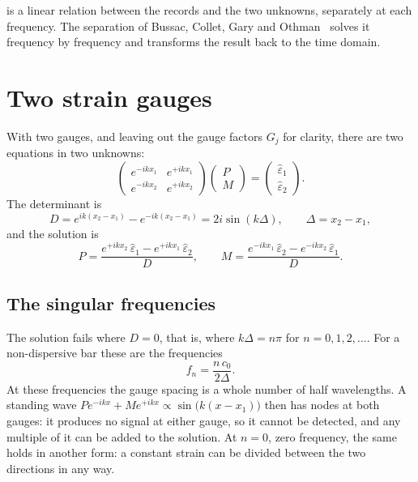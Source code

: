 \documentclass[11pt,a4paper,numbers=noenddot,abstract=true]{scrartcl}
\begin{document}
 is a linear relation between the records and the two unknowns, separately at each frequency. The separation
of Bussac, Collet, Gary and Othman~\cite{bussac2002} solves it frequency by frequency and transforms the result
back to the time domain.

\section{Two strain gauges}
\label{sec:twogauges}

With two gauges, and leaving out the gauge factors $G_j$ for clarity, there are two equations in two unknowns:
\begin{equation}
  \begin{pmatrix} e^{-ikx_1} & e^{+ikx_1} \\ e^{-ikx_2} & e^{+ikx_2} \end{pmatrix}
  \begin{pmatrix} P \\ M \end{pmatrix}
  =
  \begin{pmatrix} \hat\varepsilon_1 \\ \hat\varepsilon_2 \end{pmatrix}.
  \label{eq:twogauge}
\end{equation}
The determinant is
\begin{equation}
  D = e^{ik(x_2 - x_1)} - e^{-ik(x_2 - x_1)} = 2i \sin(k\Delta), \qquad \Delta = x_2 - x_1,
\end{equation}
and the solution is
\begin{equation}
  P = \frac{e^{+ikx_2}\, \hat\varepsilon_1 - e^{+ikx_1}\, \hat\varepsilon_2}{D}, \qquad
  M = \frac{e^{-ikx_1}\, \hat\varepsilon_2 - e^{-ikx_2}\, \hat\varepsilon_1}{D}.
  \label{eq:twogaugesolution}
\end{equation}

\subsection{The singular frequencies}

The solution fails where $D = 0$, that is, where $k\Delta = n\pi$ for $n = 0, 1, 2, \dots$. For a non-dispersive
bar these are the frequencies
\begin{equation}
  f_n = \frac{n\, c_0}{2\Delta}.
\end{equation}
At these frequencies the gauge spacing is a whole number of half wavelengths. A standing wave
$P e^{-ikx} + M e^{+ikx} \propto \sin\bigl(k(x - x_1)\bigr)$ then has nodes at both gauges: it produces no signal
at either gauge, so it cannot be detected, and any multiple of it can be added to the solution. At $n = 0$, zero
frequency, the same holds in another form: a constant strain can be divided between the two directions in any way.
\end{document}

